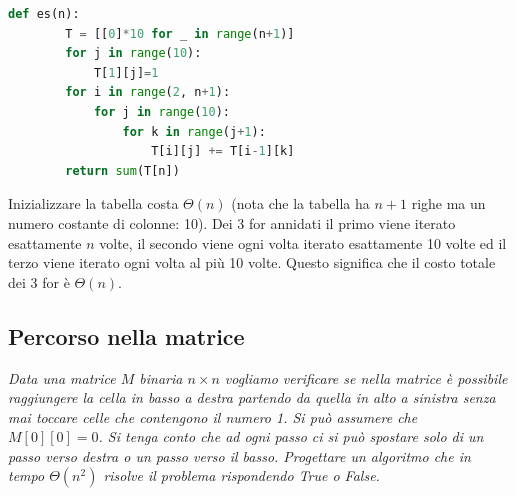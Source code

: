\begin{lstlisting}[language=Python]
    def es(n):
        T = [[0]*10 for _ in range(n+1)]
        for j in range(10):
            T[1][j]=1
        for i in range(2, n+1):
            for j in range(10):
                for k in range(j+1):
                    T[i][j] += T[i-1][k]
        return sum(T[n])
\end{lstlisting}
Inizializzare la tabella costa $\Theta(n)$ (nota che la tabella ha $n+1$ righe ma un numero costante di colonne: 10). Dei 3 for annidati il primo viene iterato esattamente $n$ volte, il secondo viene ogni volta iterato esattamente 10 volte ed il terzo viene iterato ogni volta al più 10 volte. Questo significa che il costo totale dei 3 for è $\Theta(n)$.

\subsection{Percorso nella matrice}
\textit{Data una matrice $M$ binaria $n\times n$ vogliamo verificare se nella matrice è possibile raggiungere la cella in basso a destra partendo da quella in alto a sinistra senza mai toccare celle che contengono il numero 1. Si può assumere che $M[0][0] = 0$. Si tenga conto che ad ogni passo ci si può spostare solo di un passo verso destra o un passo verso il basso. Progettare un algoritmo che in tempo $\Theta(n^2)$ risolve il problema rispondendo True o False.}


